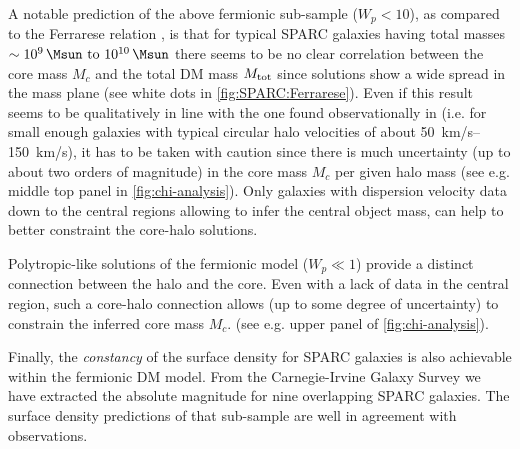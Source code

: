 A notable prediction of the above fermionic sub-sample ($W_p < 10$), as compared to the Ferrarese relation \citep{2002ApJ...578...90F}, is that for typical SPARC galaxies having total masses $\sim \SIrange{E9}{E10}{\Msun}$ there seems to be no clear correlation between the core mass $M_c$ and the total DM mass $M_{\rm tot}$ since solutions show a wide spread in the mass plane (see white dots in \cref{fig:SPARC:Ferrarese}). Even if this result seems to be qualitatively in line with the one found observationally in \cite{2011Natur.469..377K} (i.e. for small enough galaxies with typical circular halo velocities of about \SIrange{50}{150}{\kilo\metre/\second}), it has to be taken with caution since there is much uncertainty (up to about two orders of magnitude) in the core mass $M_c$ per given halo mass (see e.g. middle top panel in \cref{fig:chi-analysis}). Only galaxies with dispersion velocity data down to the central regions allowing to infer the central object mass, can help to better constraint the core-halo solutions.

Polytropic-like solutions of the fermionic model ($W_p \ll 1$) provide a distinct connection between the halo and the core. Even with a lack of data in the central region, such a core-halo connection allows (up to some degree of uncertainty) to constrain the inferred core mass $M_c$. (see e.g. upper panel of \cref{fig:chi-analysis}). 

Finally, the \textit{constancy} of the surface density \citep{2009MNRAS.397.1169D} for SPARC galaxies is also achievable within the fermionic DM model. From the Carnegie-Irvine Galaxy Survey \citep{2011ApJS..197...21H} we have extracted the absolute magnitude for nine overlapping SPARC galaxies. The surface density predictions of that sub-sample are well in agreement with observations.
